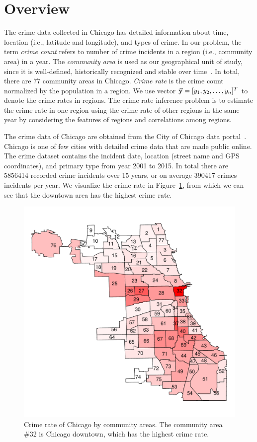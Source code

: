 
\section{Overview}
\label{sec:overview}
The crime data collected in Chicago has detailed information about time, location (i.e., latitude and longitude), and types of crime. In our problem, the term \emph{crime count} refers to number of crime incidents in a region (i.e., community area) in a year. The \emph{community area} is used as our geographical unit of study, since it is well-defined,  historically recognized and stable over time~\cite{SrGc09}. In total, there are 77 community areas in Chicago.  \emph{Crime rate} is the crime count normalized by the population in a region. We use vector $\vec{\mathbf{y}} = [y_1, y_2, \ldots, y_n]^T$ to denote the crime rates in regions. The crime rate inference problem is to estimate the crime rate in one region using the crime rate of other regions in the same year by considering the features of regions and correlations among regions. 


The crime data of Chicago are obtained from the City of Chicago data portal~\cite{crime-data}. Chicago is one of few cities with detailed crime data that are made public online. The crime dataset contains the incident date, location (street name and GPS coordinates), and primary type from year 2001 to 2015. In total there are \num{5856414} recorded crime incidents over 15 years, or on average \num{390417} crimes incidents per year. We visualize the crime rate in Figure~\ref{fig:crime-ca}, from which we can see that the downtown area has the highest crime rate.

\begin{figure}[t]
\centering
\includegraphics[width=0.6\linewidth]{fig/crime-ca.pdf}
\caption{Crime rate of Chicago by community areas. The community area \#32 is Chicago downtown, which has the highest crime rate.}
\label{fig:crime-ca}
\end{figure}


